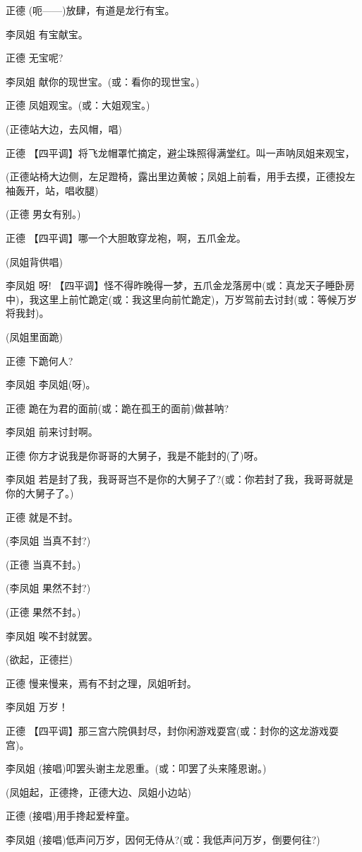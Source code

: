 正德 (呃------)放肆，有道是龙行有宝。

李凤姐 有宝献宝。

正德 无宝呢?

李凤姐 献你的现世宝。(或：看你的现世宝。)

正德 凤姐观宝。(或：大姐观宝。)

(正德站大边，去风帽，唱)

正德 【四平调】将飞龙帽罩忙摘定，避尘珠照得满堂红。叫一声呐凤姐来观宝，

(正德站椅大边侧，左足蹬椅，露出里边黄帔；凤姐上前看，用手去摸，正德投左袖轰开，站，唱收腿)

(正德 男女有别。)

正德 【四平调】哪一个大胆敢穿龙袍，啊，五爪金龙。

(凤姐背供唱)

李凤姐 呀!
【四平调】怪不得昨晚得一梦，五爪金龙落房中(或：真龙天子睡卧房中)，我这里上前忙跪定(或：我这里向前忙跪定)，万岁驾前去讨封(或：等候万岁将我封)。

(凤姐里面跪)

正德 下跪何人?

李凤姐 李凤姐(呀)。

正德 跪在为君的面前(或：跪在孤王的面前)做甚呐?

李凤姐 前来讨封啊。

正德 你方才说我是你哥哥的大舅子，我是不能封的(了)呀。

李凤姐
若是封了我，我哥哥岂不是你的大舅子了?(或：你若封了我，我哥哥就是你的大舅子了。)

正德 就是不封。

(李凤姐 当真不封?)

(正德 当真不封。)

(李凤姐 果然不封?)

(正德 果然不封。)

李凤姐 唉不封就罢。

(欲起，正德拦)

正德 慢来慢来，焉有不封之理，凤姐听封。

李凤姐 万岁！

正德
【四平调】那三宫六院俱封尽，封你闲游戏耍宫(或：封你的这龙游戏耍宫)。

李凤姐 (接唱)叩罢头谢主龙恩重。(或：叩罢了头来隆恩谢。)

(凤姐起，正德搀，正德大边、凤姐小边站)

正德 (接唱)用手搀起爱梓童。

李凤姐 (接唱)低声问万岁，因何无侍从?(或：我低声问万岁，倒要何往?)

